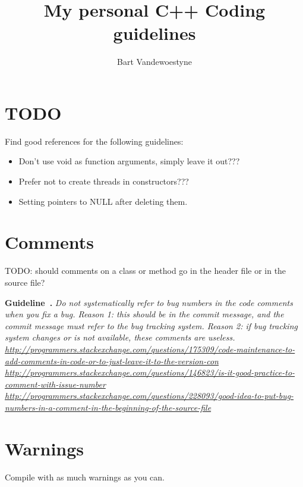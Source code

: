 \documentclass{article}
\title{My personal C++ Coding guidelines}
\author{Bart Vandewoestyne}
\newcounter{guideline}
\newenvironment{guideline}[1][]{\refstepcounter{guideline}\par\medskip
   \noindent \textbf{Guideline~\theguideline. #1} \em \rmfamily}{\medskip}
\begin{document}
	

\maketitle

\tableofcontents

\section{TODO}

Find good references for the following guidelines:
\begin{itemize}
\item Don't use void as function arguments, simply leave it out???
\item Prefer not to create threads in constructors???
\item Setting pointers to NULL after deleting them.
\end{itemize}

\section{Comments}

TODO: should comments on a class or method go in the header file or in the source file?

\begin{guideline}
Do not systematically refer to bug numbers in the code comments when you fix a bug.
Reason 1: this should be in the commit message, and the commit message must refer to the bug tracking system.
Reason 2: if bug tracking system changes or is not available, these comments are useless.
\url{http://programmers.stackexchange.com/questions/175309/code-maintenance-to-add-comments-in-code-or-to-just-leave-it-to-the-version-con}
\url{http://programmers.stackexchange.com/questions/146823/is-it-good-practice-to-comment-with-issue-number}
\url{http://programmers.stackexchange.com/questions/228093/good-idea-to-put-bug-numbers-in-a-comment-in-the-beginning-of-the-source-file}
\end{guideline}

\section{Warnings}

Compile with as much warnings as you can.
\end{document}
